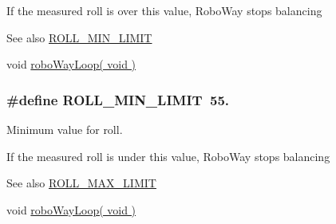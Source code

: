 \-If the measured roll is over this value, \-Robo\-Way stops balancing

\begin{DoxySeeAlso}{\-See also}
\hyperlink{group___r_o_l_l___l_i_m_i_t_s_gae368a108e75a5b699e83ad3abeafe0cb}{\-R\-O\-L\-L\-\_\-\-M\-I\-N\-\_\-\-L\-I\-M\-I\-T} 

void \hyperlink{robo_way_8h_ad9539a1dcba714de368e1f524ed976ae}{robo\-Way\-Loop( void )} 
\end{DoxySeeAlso}
\hypertarget{group___r_o_l_l___l_i_m_i_t_s_gae368a108e75a5b699e83ad3abeafe0cb}{
\subsubsection[{\-R\-O\-L\-L\-\_\-\-M\-I\-N\-\_\-\-L\-I\-M\-I\-T}]{\setlength{\rightskip}{0pt plus 5cm}\#define {\bf \-R\-O\-L\-L\-\_\-\-M\-I\-N\-\_\-\-L\-I\-M\-I\-T}~55.}}\label{group___r_o_l_l___l_i_m_i_t_s_gae368a108e75a5b699e83ad3abeafe0cb}


\-Minimum value for roll. 

\-If the measured roll is under this value, \-Robo\-Way stops balancing

\begin{DoxySeeAlso}{\-See also}
\hyperlink{group___r_o_l_l___l_i_m_i_t_s_ga7428d6dfaaef5ae9e043eedcaeba8ec7}{\-R\-O\-L\-L\-\_\-\-M\-A\-X\-\_\-\-L\-I\-M\-I\-T} 

void \hyperlink{robo_way_8h_ad9539a1dcba714de368e1f524ed976ae}{robo\-Way\-Loop( void )} 
\end{DoxySeeAlso}
